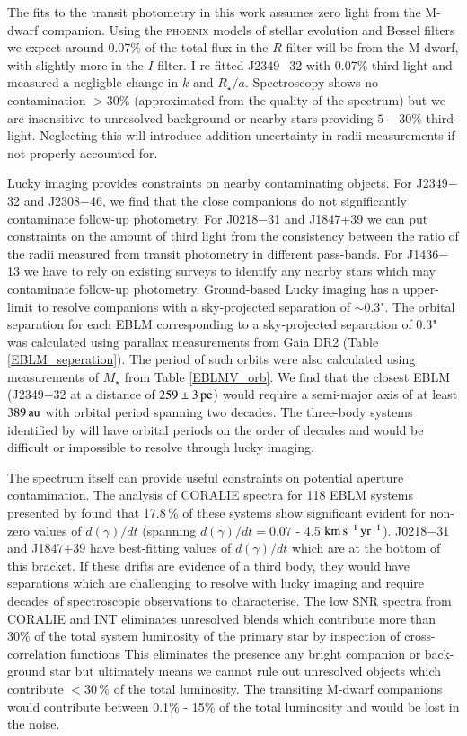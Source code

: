The fits to the transit photometry in this work assumes zero light from the M-dwarf companion. Using the \textsc{phoenix} models of stellar evolution and Bessel filters we expect around 0.07\% of the total flux in the $R$ filter will be from the M-dwarf, with slightly more in the $I$ filter. I re-fitted J2349$-$32 with 0.07\% third light and measured a negligble change in $k$ and $R_\star / a$. Spectroscopy shows no contamination $>30\%$ (approximated from the quality of the spectrum) but we are insensitive to unresolved background or nearby stars providing $5-30\%$ third-light. Neglecting this will introduce addition uncertainty in radii measurements if not properly accounted for.  

Lucky imaging provides constraints on nearby contaminating objects. For J2349$-$32 and J2308$-$46, we find that the close companions do not significantly contaminate follow-up photometry. For J0218$-$31 and J1847$+$39 we can put constraints on the amount of third light from the consistency between the ratio of the radii measured from transit photometry in different pass-bands. For J1436$-$13 we have to rely on existing surveys to identify any nearby stars which may contaminate follow-up photometry.    Ground-based Lucky imaging has a upper-limit to resolve companions with a sky-projected separation of $\sim$0.3". The orbital separation for each EBLM corresponding to a sky-projected separation of 0.3" was calculated using parallax measurements from Gaia DR2 (Table \ref{EBLM_seperation}). The period of such orbits were also calculated using measurements of $M_{\star}$ from Table \ref{EBLMV_orb}. We find that the closest EBLM (J2349$-$32 at a distance of $259 \pm 3\, \rm pc$) would require a semi-major axis of at least $389\, \rm au$ with orbital period spanning two decades. The three-body systems identified by  \citet{Triaud2017} will have orbital periods on the order of decades and would be difficult or impossible to resolve through lucky imaging. 

The spectrum itself can provide useful constraints on potential aperture contamination. The analysis of CORALIE spectra for 118 EBLM systems presented by \citet{Triaud2017} found that 17.8\,\% of these systems show significant evident for non-zero values of $d(\gamma)/dt$ (spanning $d(\gamma)/dt = 0.07$ - 4.5 $\rm km\, \rm s^{-1}\, \rm yr^{-1}$). J0218$-$31 and J1847$+$39 have best-fitting values of $d(\gamma)/dt$ which are at the bottom of this bracket.  If these drifts are evidence of a third body, they would have separations which are challenging to resolve with lucky imaging and require decades of spectroscopic observations to characterise. The low SNR spectra from CORALIE and INT eliminates unresolved blends which contribute more than 30\% of the total system luminosity of the primary star by inspection of cross-correlation functions This eliminates the presence any bright companion or  back-ground star but ultimately means we cannot rule out unresolved objects which contribute $<30\,\%$ of the total luminosity. The transiting M-dwarf companions would contribute between 0.1\% - 15\% of the total luminosity and would be lost in the noise.

